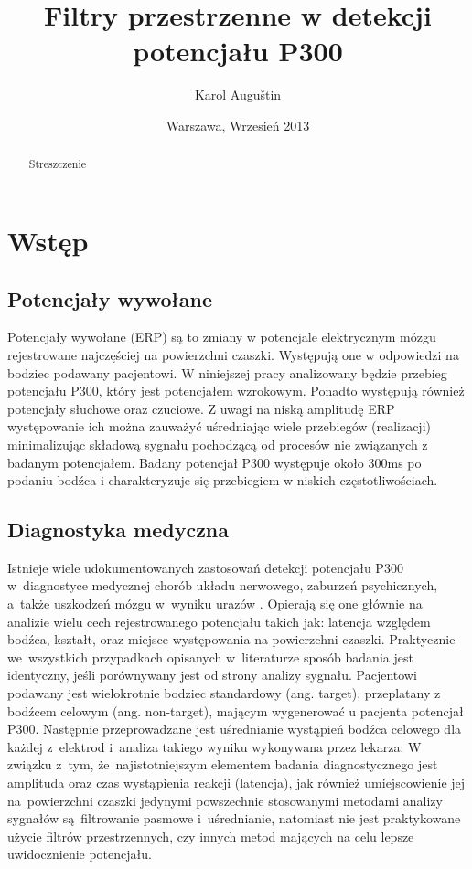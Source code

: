 \documentclass[licencjacka,openright]{pracamgr}
\author{ Karol Auguštin }
\title{ Filtry przestrzenne w detekcji potencjału P300 }
\date{Warszawa, Wrzesień 2013}
\begin{document}
\let\cleardoublepage\clearpage
\maketitle
\begin{abstract}
\par Streszczenie
\end{abstract}
\tableofcontents

\chapter{Wstęp}
\section{Potencjały wywołane}
\label{potencjaly}
Potencjały wywołane (ERP) są to zmiany w potencjale elektrycznym mózgu rejestrowane najczęściej na powierzchni czaszki. Występują one w odpowiedzi na bodziec podawany pacjentowi. W niniejszej pracy analizowany będzie przebieg potencjału P300, który jest potencjałem wzrokowym. Ponadto występują również potencjały słuchowe oraz czuciowe. 
Z uwagi na niską amplitudę ERP występowanie ich można zauważyć uśredniając wiele przebiegów (realizacji) minimalizując składową sygnału pochodzącą od procesów nie związanych z badanym potencjałem.
Badany potencjał P300 występuje około 300ms po podaniu bodźca i charakteryzuje się przebiegiem w niskich częstotliwościach. 

\section{Diagnostyka medyczna}
Istnieje wiele udokumentowanych zastosowań detekcji potencjału P300 w~diagnostyce medycznej chorób układu nerwowego, zaburzeń psychicznych, a~także uszkodzeń mózgu w~wyniku urazów \cite{zgorzalewicz2000}. Opierają się one głównie na analizie wielu cech rejestrowanego potencjału takich jak: latencja względem bodźca, kształt, oraz miejsce występowania na powierzchni czaszki. Praktycznie we~wszystkich przypadkach opisanych w~literaturze sposób badania jest identyczny, jeśli porównywany jest od strony analizy sygnału. Pacjentowi podawany jest wielokrotnie bodziec standardowy (ang. target), przeplatany z bodźcem celowym (ang. non-target), mającym wygenerować u pacjenta potencjał P300. Następnie przeprowadzane jest uśrednianie wystąpień bodźca celowego dla każdej z~elektrod i~analiza takiego wyniku wykonywana przez lekarza. 
W związku z~tym, że~najistotniejszym elementem badania diagnostycznego jest amplituda oraz czas wystąpienia reakcji (latencja), jak również umiejscowienie jej na~powierzchni czaszki  jedynymi powszechnie stosowanymi metodami analizy sygnałów są~filtrowanie pasmowe i~uśrednianie, natomiast nie jest praktykowane użycie filtrów przestrzennych, czy innych metod mających na celu lepsze uwidocznienie potencjału.
\end{document}
